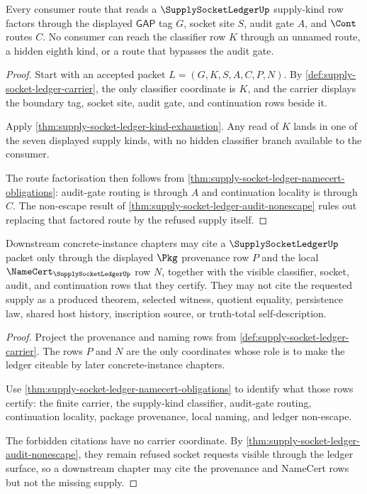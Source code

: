 \begin{theorem}
\label{thm:supply-socket-ledger-route-coverage}
Every consumer route that reads a $\SupplySocketLedgerUp$ supply-kind row factors through the displayed $\mathsf{GAP}$ tag $G$, socket site $S$, audit gate $A$, and $\Cont$ routes $C$. No consumer can reach the classifier row $K$ through an unnamed route, a hidden eighth kind, or a route that bypasses the audit gate.
\end{theorem}
\begin{proof}
Start with an accepted packet $L=(G,K,S,A,C,P,N)$. By \autoref{def:supply-socket-ledger-carrier}, the only classifier coordinate is $K$, and the carrier displays the boundary tag, socket site, audit gate, and continuation rows beside it.

Apply \autoref{thm:supply-socket-ledger-kind-exhaustion}. Any read of $K$ lands in one of the seven displayed supply kinds, with no hidden classifier branch available to the consumer.

The route factorisation then follows from \autoref{thm:supply-socket-ledger-namecert-obligations}: audit-gate routing is through $A$ and continuation locality is through $C$. The non-escape result of \autoref{thm:supply-socket-ledger-audit-nonescape} rules out replacing that factored route by the refused supply itself.
\end{proof}

\begin{theorem}
\label{thm:supply-socket-ledger-consumer-provenance}
Downstream concrete-instance chapters may cite a $\SupplySocketLedgerUp$ packet only through the displayed $\Pkg$ provenance row $P$ and the local $\NameCert_{\SupplySocketLedgerUp}$ row $N$, together with the visible classifier, socket, audit, and continuation rows that they certify. They may not cite the requested supply as a produced theorem, selected witness, quotient equality, persistence law, shared host history, inscription source, or truth-total self-description.
\end{theorem}
\begin{proof}
Project the provenance and naming rows from \autoref{def:supply-socket-ledger-carrier}. The rows $P$ and $N$ are the only coordinates whose role is to make the ledger citeable by later concrete-instance chapters.

Use \autoref{thm:supply-socket-ledger-namecert-obligations} to identify what those rows certify: the finite carrier, the supply-kind classifier, audit-gate routing, continuation locality, package provenance, local naming, and ledger non-escape.

The forbidden citations have no carrier coordinate. By \autoref{thm:supply-socket-ledger-audit-nonescape}, they remain refused socket requests visible through the ledger surface, so a downstream chapter may cite the provenance and NameCert rows but not the missing supply.
\end{proof}

